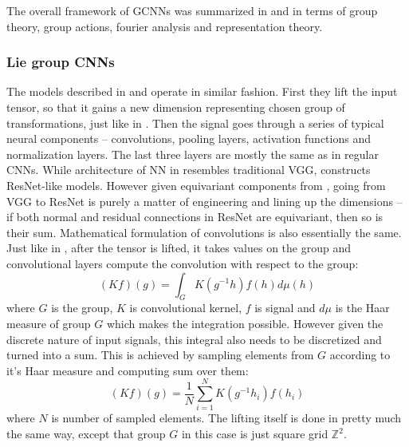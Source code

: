     The overall framework of GCNNs was summarized in \cite{kondor_trivedi} and
    \cite{cohen2020general} in terms of group
    theory, group actions, fourier analysis and representation theory.

    \subsubsection{Lie group CNNs}
    \label{sec:lie_cnn}
    The models described in \cite{lieconv} and \cite{bekkers2019} operate in
    similar fashion.
    First they lift the input tensor, so that it gains a new dimension
    representing chosen group of transformations, just like in \cite{cohen2016}.
    Then the signal goes through a series of typical neural components -- convolutions,
    pooling layers, activation functions and normalization layers. The last
    three layers are mostly the same as in regular CNNs. While
    architecture of NN in \cite{bekkers2019} resembles traditional VGG,
    \cite{lieconv} constructs ResNet-like models. However given equivariant
    components from \cite{bekkers2019}, going from VGG to ResNet is purely a
    matter of engineering and lining up the dimensions -- if both normal and
    residual connections in ResNet are equivariant, then so is their sum.
    Mathematical formulation of convolutions is also essentially the same.
    Just like in \cite{cohen2016}, after the tensor is lifted, it takes values
    on the group and convolutional layers compute the convolution with respect
    to the group:
    \begin{equation}
        (Kf)(g) = \int_G K(g^{-1}h)f(h)d\mu(h)
        \label{eq:lie_integral}
    \end{equation}
    where $G$ is the group, $K$ is convolutional kernel, $f$ is signal and $d\mu$ is the Haar
    measure of group $G$ which makes the integration possible. However given
    the discrete nature of input signals, this integral also needs to be
    discretized and turned into a sum. This is achieved by sampling elements from $G$
    according to it's Haar measure and computing sum over them:
    \begin{equation}
        (Kf)(g) = \frac{1}{N} \sum_{i=1}^N K(g^{-1}h_i)f(h_i)
        \label{eq:lie_sum}
    \end{equation}
    where $N$ is number of sampled elements. The lifting itself is done in
    pretty much the same way, except that group $G$ in this case is just square
    grid $\mathbb{Z}^2$.

